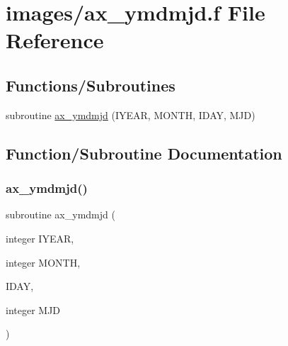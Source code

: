 \hypertarget{ax__ymdmjd_8f}{}\section{images/ax\+\_\+ymdmjd.f File Reference}
\label{ax__ymdmjd_8f}
\subsection*{Functions/\+Subroutines}
\begin{DoxyCompactItemize}
\item 
subroutine \hyperlink{ax__ymdmjd_8f_abe4dbf53745f2c07f6a879ffa1e387ea}{ax\+\_\+ymdmjd} (I\+Y\+E\+AR, M\+O\+N\+TH, I\+D\+AY, M\+JD)
\end{DoxyCompactItemize}


\subsection{Function/\+Subroutine Documentation}
\mbox{\label{ax__ymdmjd_8f_abe4dbf53745f2c07f6a879ffa1e387ea}} 
\subsubsection{\texorpdfstring{ax\+\_\+ymdmjd()}{ax\_ymdmjd()}}
{\footnotesize\ttfamily subroutine ax\+\_\+ymdmjd (\begin{DoxyParamCaption}\item[{integer}]{I\+Y\+E\+AR,  }\item[{integer}]{M\+O\+N\+TH,  }\item[{}]{I\+D\+AY,  }\item[{integer}]{M\+JD }\end{DoxyParamCaption})}

